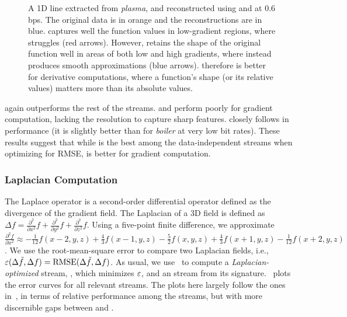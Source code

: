 \begin{figure}[!b]
\centering
{} 
\caption{A 1D line extracted from \emph{plasma}, and reconstructed using \sbit and \swav at 0.6 bps.
The original data is in orange and the reconstructions are in blue. \swav captures well the function
values in low-gradient regions, where \sbit struggles (red arrows). However, \sbit retains the shape
of the original function well in areas of both low and high gradients, where \swav instead produces
smooth approximations (blue arrows). \sbit therefore is better for derivative computations, where a
function's shape (or its relative values) matters more than its absolute values.}
\label{fig:bit-plane-vs-wavelet-norm-gradient}
\vspace{-1em}
\end{figure}



\sgop again outperforms the rest of the streams. \slvl and \smag perform poorly for gradient
computation, lacking the resolution to capture sharp features. \sgsg closely follows \sbit in
performance (it is slightly better than \sbit for \emph{boiler} at very low bit rates). These
results suggest that while \swav is the best among the data-independent streams when optimizing for
RMSE, \sbit is better for gradient computation.



\subsubsection{Laplacian Computation}\label{sec:laplacian}

The Laplace operator is a second-order differential operator defined as the divergence of the
gradient field. The Laplacian of a 3D field is defined as $\Delta f = 
\frac{{\partial}^2}{\partial{x^2}}f+\frac{{\partial}^2}{\partial{y^2}}f+\frac{{\partial}^2}{\partial{z^2}}f$.
%
Using a five-point finite difference, we approximate 
$\frac{{\partial}^2 f}{\partial{x^2}}
\approx
-\frac{1}{12}f(x-2,y,z)+\frac{4}{3}f(x-1,y,z)-\frac{5}{2}f(x,y,z)+\frac{4}{3}f(x+1,y,z)-\frac{1}{12}f(x+2,y,z)$.
We use the root-mean-square error to compare two Laplacian fields, i.e., $\err(\Delta
\tilde{f},\Delta f)=\text{RMSE}(\Delta \tilde{f},\Delta f)$. As usual, we use~ to
compute a \emph{Laplacian-optimized} stream, \slop, which minimizes $\err$, and an \slsg stream from
its signature.~ plots the error curves for all relevant
streams. The plots here largely follow the ones in~, in terms of
relative performance among the streams, but with more discernible gaps between \sbit and \slsg.



